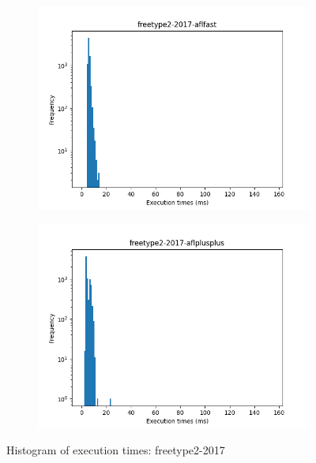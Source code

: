 \begin{figure}
\begin{subfigure}[t]{0.475\textwidth}
        \centering
        \includegraphics[width=\textwidth]{Experiments/execs/freetype2-2017-aflfast.png}
        \caption{}
        \label{fig:sub:freetype-hist-aflfast}
    \end{subfigure}
    \hfill
    \begin{subfigure}[t]{0.475\textwidth}
        \centering
        \includegraphics[width=\textwidth]{Experiments/execs/freetype2-2017-aflplusplus.png}
        \caption{}
        \label{fig:sub:freetype-hist-aflplusplus}
    \end{subfigure}

    \caption{Histogram of execution times: freetype2-2017}
    \label{fig:exe-freetype}
\end{figure}


